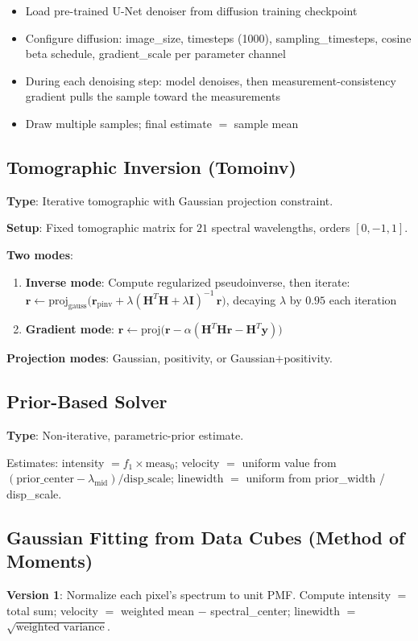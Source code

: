 \documentclass[11pt,a4paper]{article}
\begin{document}
\begin{itemize}[nosep]
  \item Load pre-trained U-Net denoiser from diffusion training checkpoint
  \item Configure diffusion: image\_size, timesteps (1000), sampling\_timesteps, cosine beta schedule, gradient\_scale per parameter channel
  \item During each denoising step: model denoises, then measurement-consistency gradient pulls the sample toward the measurements
  \item Draw multiple samples; final estimate $=$ sample mean
\end{itemize}

\subsection{Tomographic Inversion (Tomoinv)}
\textbf{Type}: Iterative tomographic with Gaussian projection constraint.

\textbf{Setup}: Fixed tomographic matrix for $21$ spectral wavelengths, orders $[0, -1, 1]$.

\textbf{Two modes}:
\begin{enumerate}[nosep]
  \item \textbf{Inverse mode}: Compute regularized pseudoinverse, then iterate: $\mathbf{r} \leftarrow \text{proj}_{\text{gauss}}\big(\mathbf{r}_{\text{pinv}} + \lambda(\mathbf{H}^T\!\mathbf{H} + \lambda\mathbf{I})^{-1}\,\mathbf{r}\big)$, decaying $\lambda$ by $0.95$ each iteration
  \item \textbf{Gradient mode}: $\mathbf{r} \leftarrow \text{proj}\big(\mathbf{r} - \alpha(\mathbf{H}^T\!\mathbf{H}\mathbf{r} - \mathbf{H}^T\!\mathbf{y})\big)$
\end{enumerate}

\textbf{Projection modes}: Gaussian, positivity, or Gaussian$+$positivity.

\subsection{Prior-Based Solver}
\textbf{Type}: Non-iterative, parametric-prior estimate.

Estimates: intensity $= f_1 \times \text{meas}_0$; velocity $=$ uniform value from $(\text{prior\_center} - \lambda_{\text{mid}}) / \text{disp\_scale}$; linewidth $=$ uniform from prior\_width / disp\_scale.

\subsection{Gaussian Fitting from Data Cubes (Method of Moments)}
\textbf{Version 1}: Normalize each pixel's spectrum to unit PMF. Compute intensity $=$ total sum; velocity $=$ weighted mean $-$ spectral\_center; linewidth $=$ $\sqrt{\text{weighted variance}}$.
\end{document}
